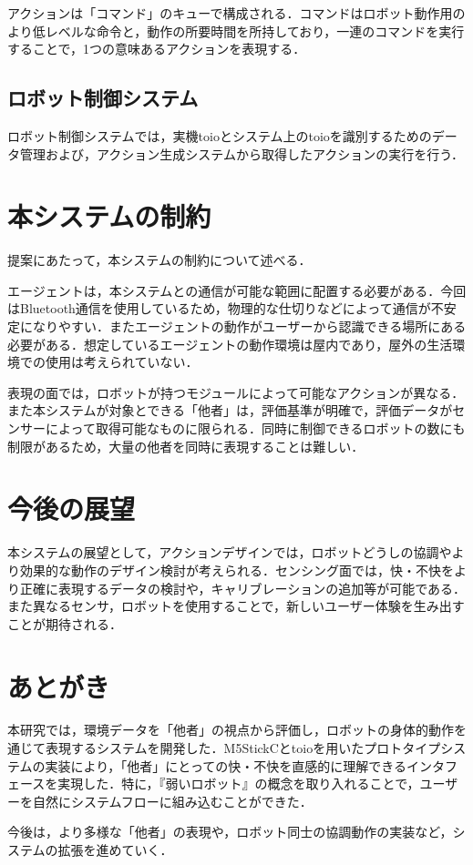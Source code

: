 \documentclass[paper=a4paper,jafontsize=9pt,head_space=15mm,gutter=20mm,
twocolumn,number_of_lines=49, line_length=26zw]{myuarticle}
\begin{document}
アクションは「コマンド」のキューで構成される．コマンドはロボット動作用のより低レベルな命令と，動作の所要時間を所持しており，一連のコマンドを実行することで，1つの意味あるアクションを表現する．

\subsection{ロボット制御システム}
ロボット制御システムでは，実機toioとシステム上のtoioを識別するためのデータ管理および，アクション生成システムから取得したアクションの実行を行う．

\section{本システムの制約}

提案にあたって，本システムの制約について述べる．

エージェントは，本システムとの通信が可能な範囲に配置する必要がある．今回はBluetooth通信を使用しているため，物理的な仕切りなどによって通信が不安定になりやすい．またエージェントの動作がユーザーから認識できる場所にある必要がある．想定しているエージェントの動作環境は屋内であり，屋外の生活環境での使用は考えられていない．

表現の面では，ロボットが持つモジュールによって可能なアクションが異なる．また本システムが対象とできる「他者」は，評価基準が明確で，評価データがセンサーによって取得可能なものに限られる．同時に制御できるロボットの数にも制限があるため，大量の他者を同時に表現することは難しい．

\section{今後の展望}
本システムの展望として，アクションデザインでは，ロボットどうしの協調やより効果的な動作のデザイン検討が考えられる．センシング面では，快・不快をより正確に表現するデータの検討や，キャリブレーションの追加等が可能である．また異なるセンサ，ロボットを使用することで，新しいユーザー体験を生み出すことが期待される．

\section{あとがき}
本研究では，環境データを「他者」の視点から評価し，ロボットの身体的動作を通じて表現するシステムを開発した．M5StickCとtoioを用いたプロトタイプシステムの実装により，「他者」にとっての快・不快を直感的に理解できるインタフェースを実現した．特に，『弱いロボット』の概念を取り入れることで，ユーザーを自然にシステムフローに組み込むことができた．

今後は，より多様な「他者」の表現や，ロボット同士の協調動作の実装など，システムの拡張を進めていく．

\renewcommand{\refname}{　参考文献}


\end{document}
